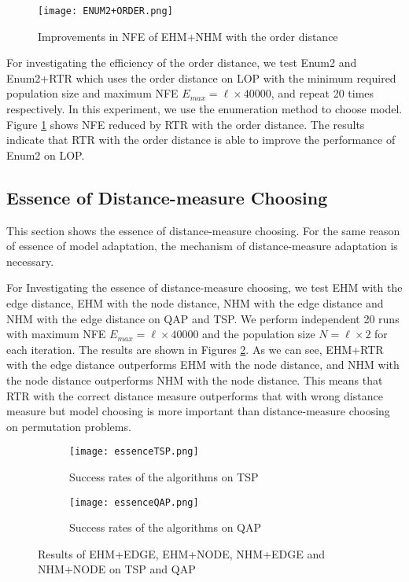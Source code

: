 \begin{figure}[htbp] 
        \centering
        \texttt{[image: ENUM2+ORDER.png]}
        \caption{ Improvements in NFE of EHM+NHM with the order distance } 
        \label{fig:enum2_imp}
\end{figure}


For investigating the efficiency of the order distance, we test Enum2 and Enum2+RTR which uses the order distance on LOP with the minimum required population size and maximum NFE $E_{max} = \ell\times 40000$, and repeat 20 times respectively. In this experiment, we use the enumeration method to choose model. Figure \ref{fig:enum2_imp} shows NFE reduced by RTR with the order distance. The results indicate that RTR with the order distance is able to improve the performance of Enum2 on LOP. 


\subsection{Essence of Distance-measure Choosing}
This section shows the essence of distance-measure choosing. For the same reason of essence of model adaptation, the mechanism of distance-measure adaptation is necessary. 


For Investigating the essence of distance-measure choosing, we test EHM with the edge distance, EHM with the node distance, NHM with the edge distance and NHM with the edge distance on QAP and TSP. We perform independent 20 runs with maximum NFE $E_{max} = \ell \times 40000$ and the population size $N=\ell\times 2$ for each iteration. The results are shown in Figures \ref{fig:essence2}. As we can see, EHM+RTR with the edge distance outperforms EHM with the node distance, and NHM with the node distance outperforms NHM with the node distance. This means that RTR with the correct distance measure outperforms that with wrong distance measure but model choosing is more important than distance-measure choosing on permutation problems.

\begin{figure}[htbp] 
        \centering
        \begin{subfigure}{1\textwidth}
            \texttt{[image: essenceTSP.png]}
            \caption{  Success rates of the algorithms on TSP } 
        \end{subfigure}

        \begin{subfigure}{1\textwidth} 
            \texttt{[image: essenceQAP.png]}
            \caption{ Success rates of the algorithms on QAP}
        \end{subfigure}
        
        \caption{ Results of EHM+EDGE, EHM+NODE, NHM+EDGE and NHM+NODE on TSP and QAP } 
        \label{fig:essence2}
\end{figure}


